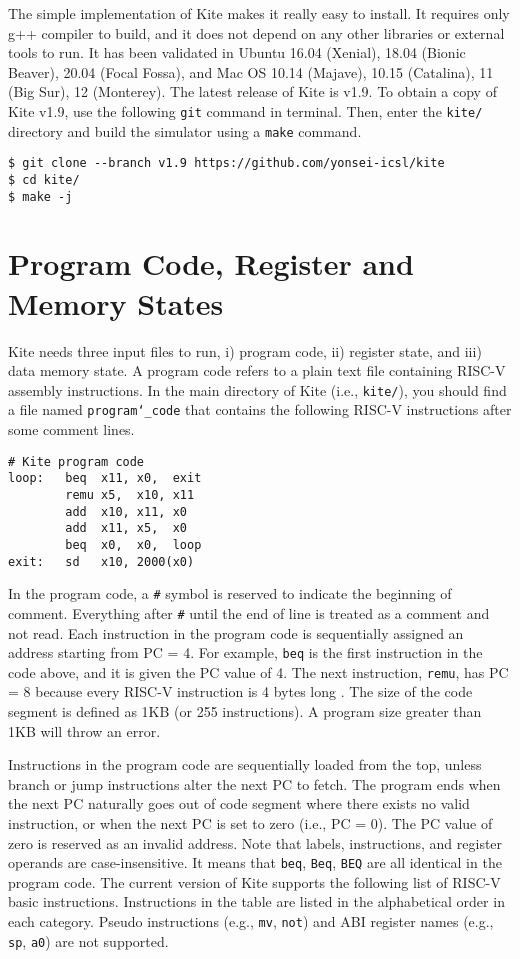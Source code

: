 \documentclass[10pt]{article}
\begin{document}
The simple implementation of Kite makes it really easy to install.
It requires only g++ compiler to build, and it does not depend on any other libraries or external tools to run.
It has been validated in Ubuntu 16.04 (Xenial), 18.04 (Bionic Beaver), 20.04 (Focal Fossa), and Mac OS 10.14 (Majave), 10.15 (Catalina), 11 (Big Sur), 12 (Monterey).
The latest release of Kite is v1.9.
To obtain a copy of Kite v1.9, use the following {\tt git} command in terminal.
Then, enter the {\tt kite/} directory and build the simulator using a {\tt make} command.

\begin{Verbatim}[frame=single]
$ git clone --branch v1.9 https://github.com/yonsei-icsl/kite
$ cd kite/
$ make -j
\end{Verbatim}


\section{Program Code, Register and Memory States} \label{sec:inputs}
Kite needs three input files to run, i) program code, ii) register state, and iii) data memory state.
A program code refers to a plain text file containing RISC-V assembly instructions.
In the main directory of Kite (i.e., {\tt kite/}), you should find a file named {\tt program\char`_code} that contains the following RISC-V instructions after some comment lines.
\pagebreak

\begin{Verbatim}[frame=single]
# Kite program code
loop:   beq  x11, x0,  exit
        remu x5,  x10, x11
        add  x10, x11, x0
        add  x11, x5,  x0
        beq  x0,  x0,  loop
exit:   sd   x10, 2000(x0)
\end{Verbatim}

In the program code, a {\tt \#} symbol is reserved to indicate the beginning of comment.
Everything after {\tt \#} until the end of line is treated as a comment and not read.
Each instruction in the program code is sequentially assigned an address starting from PC = 4.
For example, {\tt beq} is the first instruction in the code above, and it is given the PC value of 4.
The next instruction, {\tt remu}, has PC = 8 because every RISC-V instruction is 4 bytes long \cite{waterman_riscv2019}.
The size of the code segment is defined as 1KB (or 255 instructions).
A program size greater than 1KB will throw an error.

Instructions in the program code are sequentially loaded from the top, unless branch or jump instructions alter the next PC to fetch.
The program ends when the next PC naturally goes out of code segment where there exists no valid instruction, or when the next PC is set to zero (i.e., PC = 0).
The PC value of zero is reserved as an invalid address.
Note that labels, instructions, and register operands are case-insensitive.
It means that {\tt beq}, {\tt Beq}, {\tt BEQ} are all identical in the program code.
The current version of Kite supports the following list of RISC-V basic instructions.
Instructions in the table are listed in the alphabetical order in each category.
Pseudo instructions (e.g., {\tt mv}, {\tt not}) and ABI register names (e.g., {\tt sp}, {\tt a0}) are not supported.
\end{document}
